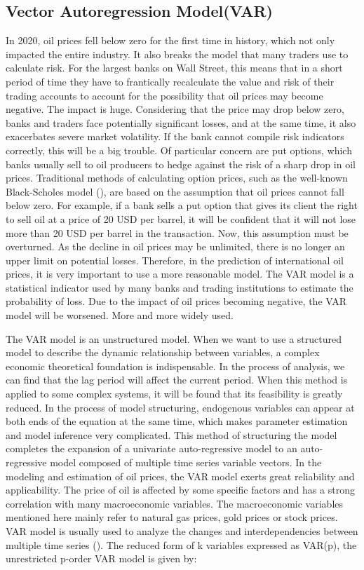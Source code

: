 \subsection{Vector Autoregression Model(VAR)}
In 2020, oil prices fell below zero for the first time in history, which not only impacted the entire industry. It also breaks the model that many traders use to calculate risk. For the largest banks on Wall Street, this means that in a short period of time they have to frantically recalculate the value and risk of their trading accounts to account for the possibility that oil prices may become negative. The impact is huge. Considering that the price may drop below zero, banks and traders face potentially significant losses, and at the same time, it also exacerbates severe market volatility. If the bank cannot compile risk indicators correctly, this will be a big trouble.  Of particular concern are put options, which banks usually sell to oil producers to hedge against the risk of a sharp drop in oil prices.  Traditional methods of calculating option prices, such as the well-known Black-Scholes model (\cite{lauterbach1990pricing}), are based on the assumption that oil prices cannot fall below zero. For example, if a bank sells a put option that gives its client the right to sell oil at a price of 20 USD per barrel, it will be confident that it will not lose more than 20 USD per barrel in the transaction. Now, this assumption must be overturned. As the decline in oil prices may be unlimited, there is no longer an upper limit on potential losses. Therefore, in the prediction of international oil prices, it is very important to use a more reasonable model. The VAR model is a statistical indicator used by many banks and trading institutions to estimate the probability of loss. Due to the impact of oil prices becoming negative, the VAR model will be worsened. More and more widely used.

The VAR model is an unstructured model. When we want to use a structured model to describe the dynamic relationship between variables, a complex economic theoretical foundation is indispensable. In the process of analysis, we can find that the lag period will affect the current period. When this method is applied to some complex systems, it will be found that its feasibility is greatly reduced.  In the process of model structuring, endogenous variables can appear at both ends of the equation at the same time, which makes parameter estimation and model inference very complicated. This method of structuring the model completes the expansion of a univariate auto-regressive model to an auto-regressive model composed of multiple time series variable vectors.  In the modeling and estimation of oil prices, the VAR model exerts great reliability and applicability. The price of oil is affected by some specific factors and has a strong correlation with many macroeconomic variables. The macroeconomic variables mentioned here mainly refer to natural gas prices, gold prices or stock prices. VAR model is usually used to analyze the changes and interdependencies between multiple time series (\cite{huntington2013oil}).
The reduced form of k variables expressed as VAR(p), the unrestricted p-order VAR model is given by: 

